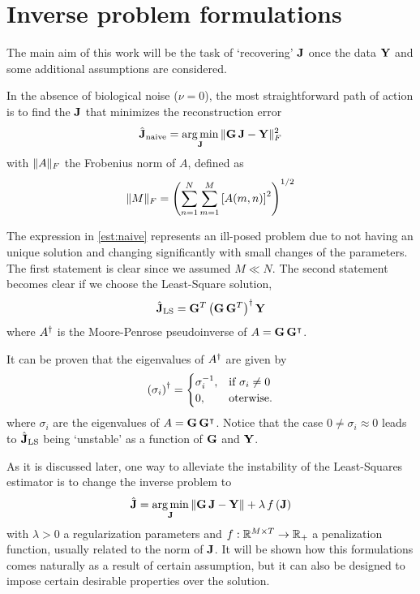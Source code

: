 \section{Inverse problem formulations}

The main aim of this work will be the task of `recovering' $\mathbf{J}$ once the data $\mathbf{Y}$ and some additional assumptions are considered.

In the absence of biological noise ($\nu = 0$),
the most straightforward path of action is to find the $\mathbf{J}$ that minimizes the reconstruction error
\begin{equation}
\hat{\J}_{\text{naive}} =
\argmin_{\J}\, \nnorm{\G\, \J- \Y}_F^2 %
\label{est:naive}
\end{equation}
with $\lVert A \rVert_F$ the Frobenius norm of $A$, defined as
\begin{equation}
\lVert M \rVert_F =
\left( 
\sum_{n=1}^N \sum_{m=1}^M \left[ A(m,n) \right]^2
 \right)^{1/2}
\end{equation}

The expression in \eqref{est:naive} represents
an ill-posed problem due to not having an unique solution and changing significantly with small changes of the parameters.
%
The first statement is clear since we assumed $M\ll N$.
%
The second statement becomes clear if we choose the Least-Square solution,
\begin{equation}
\hat{\mathbf{J}}_{\text{LS}} =
\mathbf{G}^T \left( \mathbf{G}\, \mathbf{G}^T \right)^\dagger \mathbf{Y}
\end{equation}
where $A^\dagger$ is the Moore-Penrose pseudoinverse of $A=\mathbf{G}\, \mathbf{G}^\intercal$.

It can be proven that the eigenvalues of $A^\dagger$ are given by
\begin{equation}
\left( \sigma_i \right)^\dagger =
\begin{cases}
\sigma_i^{-1}, &\text{if } \sigma_i\neq 0 \\
0, &\text{oterwise}.
\end{cases}
\end{equation}
where $\sigma_i$ are the eigenvalues of $A=\mathbf{G}\, \mathbf{G}^\intercal$. 
%
Notice that the case $0\neq \sigma_i \approx 0$ leads to $\hat{\mathbf{J}}_{\text{LS}}$ being `unstable' as a function of $\mathbf{G}$ and $\mathbf{Y}$.

As it is discussed later, one way to alleviate the instability of the Least-Squares estimator is to change the inverse problem to
\begin{equation}
\hat{\mathbf{J}} = \operatorname*{arg\,min}_{\mathbf{J}}\, \lVert \mathbf{G}\, \mathbf{J} - \mathbf{Y} \rVert + \lambda\, f\left( \mathbf{J} \right)
\label{est:gral}
\end{equation}
with $\lambda>0$ a regularization parameters and
$f: \mathbb{R}^{M\times T} \rightarrow \mathbb{R}_+$ a penalization function, usually related to the norm of $\mathbf{J}$.
%
It will be shown how this formulations comes naturally as a result of certain assumption, but it can also be designed to impose certain desirable properties over the solution.

